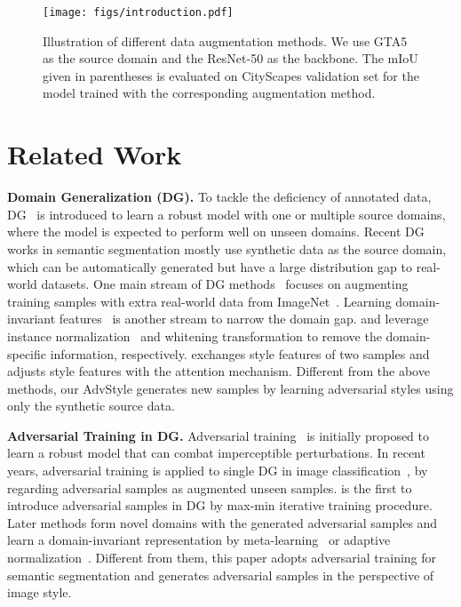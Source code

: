 \documentclass{article}
\newcommand{\ours}{AdvStyle\xspace}
\begin{document}
\begin{figure*}[t]
\centering
\texttt{[image: figs/introduction.pdf]}
\caption{Illustration of different data augmentation methods. We use GTA5 as the source domain and the ResNet-50 as the backbone. The mIoU given in parentheses is evaluated on CityScapes validation set for the model trained with the corresponding augmentation method.}
\label{fig:aug_show}
\end{figure*}


\section{Related Work}
\label{sec:related-work}


\textbf{Domain Generalization (DG).} To tackle the deficiency of annotated data, DG~\cite{DRPC, FSDR,robustnet,crossnorm,zhao2022style,chen2022maxstyle,zhao2021learning} is introduced to learn a robust model with one or multiple source domains, where the model is expected to perform well on unseen domains. Recent DG works in semantic segmentation mostly use synthetic data as the source domain, which can be automatically generated but have a large distribution gap to real-world datasets. One main stream of DG methods~\cite{DRPC, FSDR} focuses on augmenting training samples with extra real-world data from ImageNet~\cite{imagenet}. Learning domain-invariant features~\cite{robustnet, ibn, crossnorm} is another stream to narrow the domain gap. \cite{ibn} and \cite{robustnet}  leverage instance normalization~\cite{in} and whitening transformation to remove the domain-specific information, respectively.  \cite{crossnorm} exchanges style features of two samples and adjusts style features with the attention mechanism. Different from the above methods, our \ours generates new samples by learning adversarial styles using only the synthetic source data.


\textbf{Adversarial Training in DG.}
Adversarial training~\cite{goodfellow2015explaining} is initially proposed to learn a robust model that can combat imperceptible perturbations. In recent years, adversarial training is applied to single DG in image classification~\cite{volpi2018generalizing,qiao2020learning,qiao2021uncertainty,fan2021adversarially}, by regarding adversarial samples as augmented unseen samples.
\cite{volpi2018generalizing} is the first to introduce adversarial samples in DG by max-min iterative training procedure. Later methods form novel domains with the generated adversarial samples and learn a domain-invariant representation by meta-learning~\cite{qiao2020learning, qiao2021uncertainty} or adaptive normalization~\cite{fan2021adversarially}. Different from them, this paper adopts adversarial training for semantic segmentation and generates adversarial samples in the perspective of image style.
\end{document}

